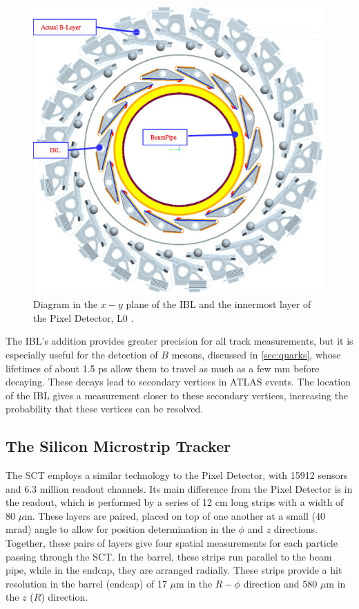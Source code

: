 \begin{centering}
\begin{figure}[bth]
\myfloatalign
\includegraphics[width=.90\linewidth]{figures/atlas/IBL-other.png}
\caption{Diagram in the $x-y$ plane of the \ac{IBL} and the innermost layer of the Pixel Detector, L0 \cite{1201.5469}.}
\label{fig:ibl_add}
\end{figure}
\end{centering}

The \ac{IBL}'s addition provides greater precision for all track measurements, but it is especially useful for the detection of $B$ mesons, discussed in \autoref{sec:quarks}, whose lifetimes of about 1.5 ps allow them to travel as much as a few mm before decaying. These decays lead to secondary vertices in \ac{ATLAS} events. The location of the \ac{IBL} gives a measurement closer to these secondary vertices, increasing the probability that these vertices can be resolved. 

\subsection{The Silicon Microstrip Tracker}

The \ac{SCT} employs a similar technology to the Pixel Detector, with 15912 sensors and 6.3 million readout channels. Its main difference from the Pixel Detector is in the readout, which is performed by a series of 12 cm long strips with a width of 80 $\mu$m. These layers are paired, placed on top of one another at a small (40 mrad) angle to allow for position determination in the $\phi$ and $z$ directions. Together, these pairs of layers give four spatial measurements for each particle passing through the \ac{SCT}. In the barrel, these strips run parallel to the beam pipe, while in the endcap, they are arranged radially. These strips provide a hit resolution in the barrel (endcap) of 17 $\mu$m in the $R-\phi$ direction and 580 $\mu$m in the $z$ ($R$) direction. 

